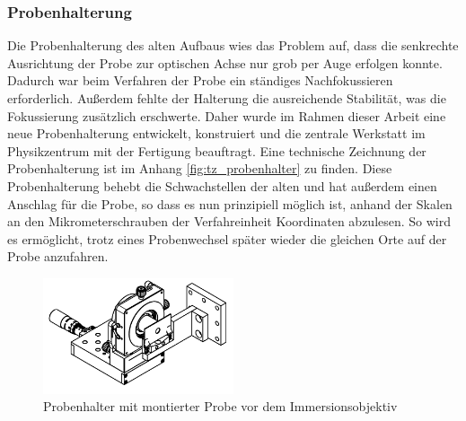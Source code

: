 \documentclass[a4paper, titlepage,  ngerman]{book}
\begin{document}
	\subsubsection{Probenhalterung}
	Die Probenhalterung des alten Aufbaus wies das Problem auf, dass die senkrechte Ausrichtung der Probe zur optischen Achse nur grob per Auge erfolgen konnte. Dadurch war beim Verfahren der Probe ein ständiges Nachfokussieren erforderlich. Außerdem fehlte der Halterung die ausreichende Stabilität, was die Fokussierung zusätzlich erschwerte. Daher wurde im Rahmen dieser Arbeit eine neue Probenhalterung entwickelt, konstruiert und die zentrale Werkstatt im Physikzentrum mit der Fertigung beauftragt. Eine technische Zeichnung der Probenhalterung ist im Anhang \ref{fig:tz_probenhalter} zu finden. Diese Probenhalterung behebt die Schwachstellen der alten und hat außerdem einen Anschlag für die Probe, so dass es nun prinzipiell möglich ist, anhand der Skalen an den Mikrometerschrauben der Verfahreinheit Koordinaten abzulesen. So wird es ermöglicht, trotz eines Probenwechsel später wieder die gleichen Orte auf der Probe anzufahren.
	\begin{figure} 
		\centering
		\includegraphics[width=0.5\textwidth]{figures/Probenhalter.pdf}
		\caption[Probenhalterung]{Probenhalter mit montierter Probe vor dem Immersionsobjektiv}
		\label{fig:probenhalter}
	\end{figure}
\end{document}
